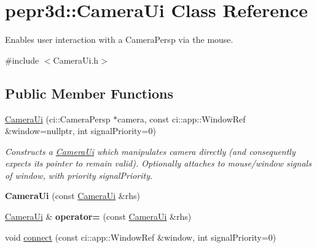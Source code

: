 \hypertarget{classpepr3d_1_1_camera_ui}{}\section{pepr3d\+::Camera\+Ui Class Reference}
\label{classpepr3d_1_1_camera_ui}


Enables user interaction with a Camera\+Persp via the mouse.  




{\ttfamily \#include $<$Camera\+Ui.\+h$>$}

\subsection*{Public Member Functions}
\begin{DoxyCompactItemize}
\item 
\mbox{\label{classpepr3d_1_1_camera_ui_a760af7644107708a275ef37cf49b64d8}} 
\mbox{\hyperlink{classpepr3d_1_1_camera_ui_a760af7644107708a275ef37cf49b64d8}{Camera\+Ui}} (ci\+::\+Camera\+Persp $\ast$camera, const ci\+::app\+::\+Window\+Ref \&window=nullptr, int signal\+Priority=0)
\begin{DoxyCompactList}\small\item\em Constructs a \mbox{\hyperlink{classpepr3d_1_1_camera_ui}{Camera\+Ui}} which manipulates {\itshape camera} directly (and consequently expects its pointer to remain valid). Optionally attaches to mouse/window signals of {\itshape window}, with priority {\itshape signal\+Priority}. \end{DoxyCompactList}\item 
\mbox{\label{classpepr3d_1_1_camera_ui_a5ecf40fe7902f4b68834ff8ad7ea8dcf}} 
{\bfseries Camera\+Ui} (const \mbox{\hyperlink{classpepr3d_1_1_camera_ui}{Camera\+Ui}} \&rhs)
\item 
\mbox{\label{classpepr3d_1_1_camera_ui_ada5f1969fe7c35ed1c2a7b75c34f302a}} 
\mbox{\hyperlink{classpepr3d_1_1_camera_ui}{Camera\+Ui}} \& {\bfseries operator=} (const \mbox{\hyperlink{classpepr3d_1_1_camera_ui}{Camera\+Ui}} \&rhs)
\item 
\mbox{\label{classpepr3d_1_1_camera_ui_a740dadafa1f80d92bf2a902d86f61158}} 
void \mbox{\hyperlink{classpepr3d_1_1_camera_ui_a740dadafa1f80d92bf2a902d86f61158}{connect}} (const ci\+::app\+::\+Window\+Ref \&window, int signal\+Priority=0)

\end{DoxyCompactItemize}
